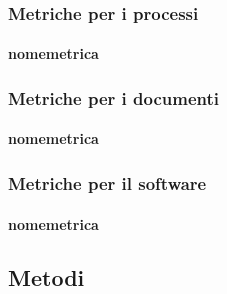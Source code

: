 		\subsubsection{Metriche per i processi}
			\paragraph{nomemetrica}			
		\subsubsection{Metriche per i documenti}
			\paragraph{nomemetrica}
		\subsubsection{Metriche per il software}
			\paragraph{nomemetrica}
	\subsection{Metodi}
\fi

